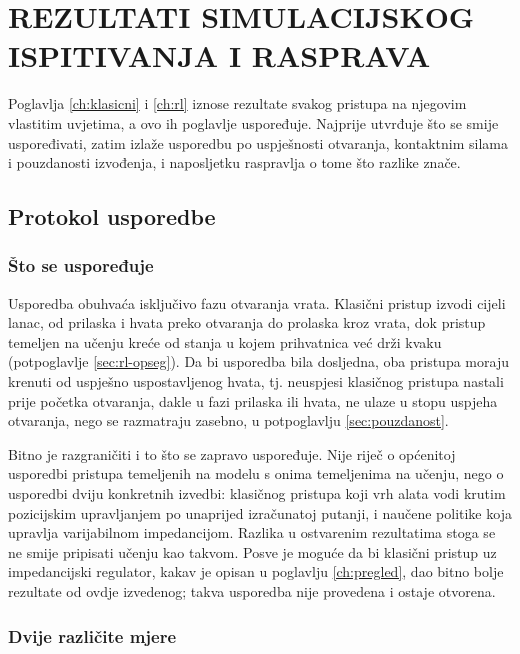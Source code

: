 \chapter{REZULTATI SIMULACIJSKOG ISPITIVANJA I RASPRAVA}
\label{ch:rezultati}

Poglavlja \ref{ch:klasicni} i \ref{ch:rl} iznose rezultate svakog pristupa na njegovim vlastitim
uvjetima, a ovo ih poglavlje uspoređuje. Najprije utvrđuje što se smije uspoređivati, zatim izlaže
usporedbu po uspješnosti otvaranja, kontaktnim silama i pouzdanosti izvođenja, i naposljetku
raspravlja o tome što razlike znače.

\section{Protokol usporedbe}
\label{sec:metrike}

\subsection{Što se uspoređuje}

Usporedba obuhvaća isključivo fazu otvaranja vrata. Klasični pristup izvodi cijeli lanac,
od prilaska i hvata preko otvaranja do prolaska kroz vrata, dok pristup temeljen na učenju kreće
od stanja u kojem prihvatnica već drži kvaku (potpoglavlje \ref{sec:rl-opseg}). Da bi usporedba
bila dosljedna, oba pristupa moraju krenuti od uspješno uspostavljenog hvata, tj. neuspjesi klasičnog
pristupa nastali prije početka otvaranja, dakle u fazi prilaska ili hvata, ne ulaze u
stopu uspjeha otvaranja, nego se razmatraju zasebno, u potpoglavlju \ref{sec:pouzdanost}.

Bitno je razgraničiti i to što se zapravo uspoređuje. Nije riječ o općenitoj usporedbi
pristupa temeljenih na modelu s onima temeljenima na učenju, nego o usporedbi dviju konkretnih
izvedbi: klasičnog pristupa koji vrh alata vodi krutim pozicijskim upravljanjem po
unaprijed izračunatoj putanji, i naučene politike koja upravlja varijabilnom impedancijom.
Razlika u ostvarenim rezultatima stoga se ne smije pripisati učenju kao takvom. Posve je moguće
da bi klasični pristup uz impedancijski regulator, kakav je opisan u poglavlju \ref{ch:pregled},
dao bitno bolje rezultate od ovdje izvedenog; takva usporedba nije provedena i ostaje otvorena.

\subsection{Dvije različite mjere}
\label{sec:dvije-mjere}

